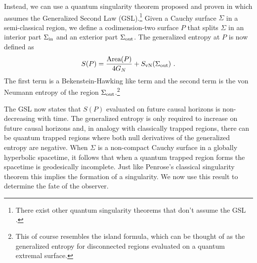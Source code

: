 \documentclass[a4paper,11pt]{article}
\newcommand{\beq}{\begin{equation}}
\newcommand{\eeq}{\end{equation}}
\numberwithin{equation}{section}
\begin{document}
Instead, we can use a quantum singularity theorem proposed and proven in \cite{C:2013uza} which assumes the Generalized Second Law (GSL).\footnote{There exist other quantum singularity theorems that don't assume the GSL \cite{Freivogel:2020hiz}.} Given a Cauchy surface $\Sigma$ in a semi-classical region, we define a codimension-two surface $P$ that splits $\Sigma$ in an interior part $\Sigma_{\rm in}$ and an exterior part $\Sigma_{\rm out}$. The generalized entropy at $P$ is now defined as
\beq
S(P) = \frac{\text{Area}(P)}{4G_N} + S_{\rm vN}(\Sigma_{\rm out}) ~.
\eeq
The first term is a Bekenstein-Hawking like term and the second term is the von Neumann entropy of the region $\Sigma_{\rm out}$.\footnote{This of course resembles the island formula, which can be thought of as the generalized entropy for disconnected regions evaluated on a quantum extremal surface.}

The GSL now states that $S(P)$ evaluated on future causal horizons is non-decreasing with time. The generalized entropy is only required to increase on future causal horizons and, in analogy with classically trapped regions, there can be quantum trapped regions where both null derivatives of the generalized entropy are negative. When $\Sigma$ is a non-compact Cauchy surface in a globally hyperbolic spacetime, it follows \cite{C:2013uza} that when a quantum trapped region forms the spacetime is geodesically incomplete. Just like Penrose's classical singularity theorem this implies the formation of a singularity. We now use this result to determine the fate of the observer.
\end{document}
